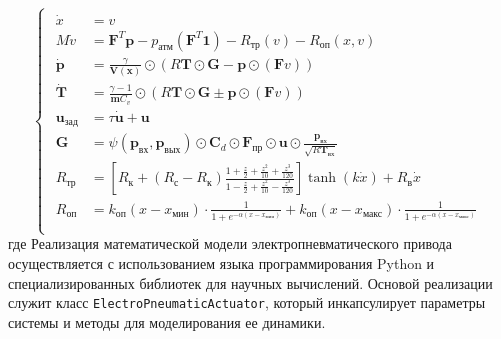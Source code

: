 \begin{equation}
    \begin{cases}
        \begin{alignedat}{2}
            \dot{x}               & = v                                                                                                                                                                                                   \\
            M\dot{v}              & = \mathbf{F}^T\mathbf{p} - p_\text{атм}(\mathbf{F}^T\mathbf{1}) - R_\text{тр}(v) - R_\text{оп}(x, v)                                                                                                  \\
            \dot{\mathbf{p}}      & = \frac{\gamma}{\mathbf{V}(\mathbf{x})} \odot (R\mathbf{T} \odot \mathbf{G} - \mathbf{p} \odot (\mathbf{F}v))                                                                                         \\
            \dot{\mathbf{T}}      & = \frac{\gamma-1}{\mathbf{m}C_v} \odot (R\mathbf{T} \odot \mathbf{G} \pm \mathbf{p} \odot (\mathbf{F}v))                                                                                              \\
            \mathbf{u}_\text{зад} & = \tau \dot{\mathbf{u}} + \mathbf{u}                                                                                                                                                                  \\
            \mathbf{G}            & = \psi(\mathbf{p}_\text{вх}, \mathbf{p}_\text{вых}) \odot \mathbf{C}_d \odot \mathbf{F}_\text{пр} \odot \mathbf{u} \odot \frac{\mathbf{p}_\text{вх}}{\sqrt{R\mathbf{T}_\text{вх}}}                    \\
            R_\text{тр}           & = \left[R_\text{к} + (R_\text{с} - R_\text{к})\frac{1 + \frac{z}{2} + \frac{z^2}{10} + \frac{z^3}{120}}{1 - \frac{z}{2} + \frac{z^2}{10} - \frac{z^3}{120}}\right]\tanh(k\dot{x}) + R_\text{в}\dot{x} \\
            R_\text{оп}           & = k_\text{оп}(x - x_\text{мин})\cdot \frac{1}{1 + e^{-\alpha(x - x_\text{мин})}} + k_\text{оп}(x - x_\text{макс})\cdot \frac{1}{1 + e^{-\alpha(x - x_\text{макс})}}                                   \\
        \end{alignedat}
    \end{cases}
\end{equation}
где
Реализация математической модели электропневматического привода осуществляется с использованием языка программирования Python
и специализированных библиотек для научных вычислений. Основой реализации служит класс \texttt{ElectroPneumaticActuator},
который инкапсулирует параметры системы и методы для моделирования ее динамики.

